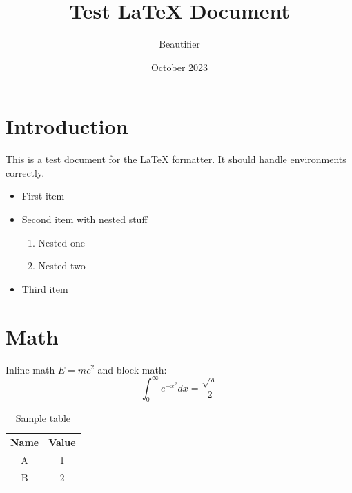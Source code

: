 \documentclass{article}
\title{Test LaTeX Document}
\author{Beautifier}
\date{October 2023}
\begin{document}
\maketitle

\section{Introduction}
This is a test document for the LaTeX formatter.
It should handle environments correctly.

\begin{itemize}
\item First item
\item Second item with nested stuff
\begin{enumerate}
\item Nested one
\item Nested two
\end{enumerate}
\item Third item
\end{itemize}

\section{Math}
Inline math $E=mc^2$ and block math:
\[
\int_{0}^{\infty} e^{-x^2} dx = \frac{\sqrt{\pi}}{2}
\]

\begin{table}[h]
\centering
\begin{tabular}{|c|c|}
\hline
Name & Value \\
\hline
A & 1 \\
B & 2 \\
\hline
\end{tabular}
\caption{Sample table}
\end{table}
\end{document}
